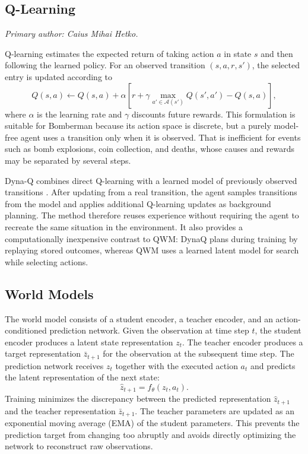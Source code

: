 \documentclass[article, 10pt]{IEEEtran}
\begin{document}
\subsection{Q-Learning}

\textit{Primary author: Caius Mihai Hetko.}

Q-learning estimates the expected return of taking action $a$ in state $s$ and then following the learned policy. For an observed transition $(s,a,r,s')$, the selected entry is updated according to
\begin{equation}
Q(s,a) \leftarrow Q(s,a) + \alpha \left[r + \gamma \max_{a' \in \mathcal{A}(s')} Q(s',a') - Q(s,a)\right],
\end{equation}
where $\alpha$ is the learning rate and $\gamma$ discounts future rewards. This formulation is suitable for Bomberman because its action space is discrete, but a purely model-free agent uses a transition only when it is observed. That is inefficient for events such as bomb explosions, coin collection, and deaths, whose causes and rewards may be separated by several steps.

Dyna-Q combines direct Q-learning with a learned model of previously observed transitions \cite{sutton1990integrated}. After updating from a real transition, the agent samples transitions from the model and applies additional Q-learning updates as background planning. The method therefore reuses experience without requiring the agent to recreate the same situation in the environment. It also provides a computationally inexpensive contrast to QWM: DynaQ plans during training by replaying stored outcomes, whereas QWM uses a learned latent model for search while selecting actions.

\subsection{World Models}

The world model consists of a student encoder, a teacher encoder, and an action-conditioned prediction network. Given the observation at time step \(t\), the student encoder produces a latent state representation \(z_t\). The teacher encoder produces a target representation \(\bar{z}_{t+1}\) for the observation at the subsequent time step. The prediction network receives \(z_t\) together with the executed action \(a_t\) and predicts the latent representation of the next state:
\[
\hat{z}_{t+1} = f_{\theta}(z_t, a_t).
\]
Training minimizes the discrepancy between the predicted representation \(\hat{z}_{t+1}\) and the teacher representation \(\bar{z}_{t+1}\). The teacher parameters are updated as an exponential moving average (EMA) of the student parameters. This prevents the prediction target from changing too abruptly and avoids directly optimizing the network to reconstruct raw observations.
\end{document}
